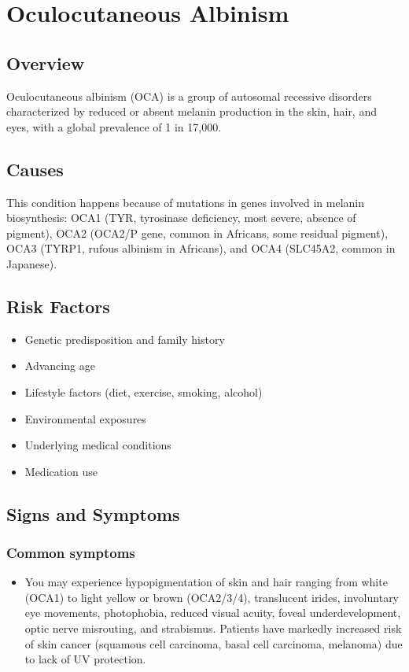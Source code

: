 \chapter{Oculocutaneous Albinism}
\label{sec:Oculocutaneous Albinism}

\section{Overview}
Oculocutaneous albinism (OCA) is a group of autosomal recessive disorders characterized by reduced or absent melanin production in the skin, hair, and eyes, with a global prevalence of 1 in 17,000.
\section{Causes}
This condition happens because of mutations in genes involved in melanin biosynthesis: OCA1 (TYR, tyrosinase deficiency, most severe, absence of pigment), OCA2 (OCA2/P gene, common in Africans, some residual pigment), OCA3 (TYRP1, rufous albinism in Africans), and OCA4 (SLC45A2, common in Japanese).     
\section{Risk Factors}

\begin{itemize}[noitemsep]
  \item Genetic predisposition and family history
  \item Advancing age
  \item Lifestyle factors (diet, exercise, smoking, alcohol)
  \item Environmental exposures
  \item Underlying medical conditions
  \item Medication use
\end{itemize}
\section{Signs and Symptoms}

\subsection{Common symptoms}
\begin{itemize}[noitemsep]
  \item You may experience hypopigmentation of skin and hair ranging from white (OCA1) to light yellow or brown (OCA2/3/4), translucent irides, involuntary eye movements, photophobia, reduced visual acuity, foveal underdevelopment, optic nerve misrouting, and strabismus. Patients have markedly increased risk of skin cancer (squamous cell carcinoma, basal cell carcinoma, melanoma) due to lack of UV protection. 
  \end{itemize}

